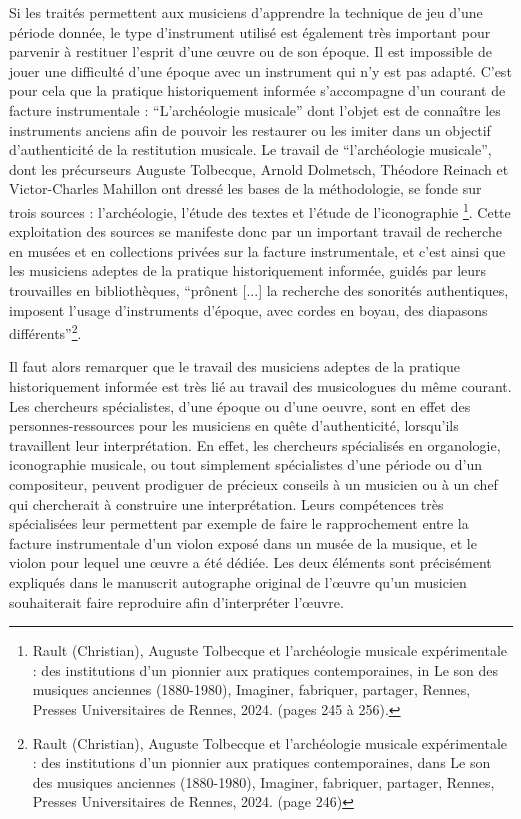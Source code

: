 Si les traités permettent aux musiciens d'apprendre la technique de jeu d'une période donnée, le type d'instrument utilisé est également très important pour parvenir à restituer l'esprit d'une œuvre ou de son époque. Il est impossible de jouer une difficulté d'une époque avec un instrument qui n'y est pas adapté. C'est pour cela que la pratique historiquement informée s'accompagne d'un courant de facture instrumentale : \enquote{L'archéologie musicale} dont l'objet est de connaître les instruments anciens afin de pouvoir les restaurer ou les imiter dans un objectif d'authenticité de la restitution musicale. Le travail de \enquote{l'archéologie musicale}, dont les précurseurs  Auguste Tolbecque, Arnold Dolmetsch, Théodore Reinach et Victor-Charles Mahillon ont dressé les bases de la méthodologie, se fonde sur trois sources : l'archéologie, l'étude des textes et l'étude de l'iconographie \footnote{Rault (Christian), Auguste Tolbecque et l'archéologie musicale expérimentale : des institutions d'un pionnier aux pratiques contemporaines, in Le son des musiques anciennes (1880-1980), Imaginer, fabriquer, partager, Rennes, Presses Universitaires de Rennes, 2024. (pages 245 à 256).}. Cette exploitation des sources se manifeste donc par un important travail de recherche en musées et en collections privées sur la facture instrumentale, et c'est ainsi que les musiciens adeptes de la pratique historiquement informée, guidés par leurs trouvailles en bibliothèques, \enquote{prônent [...] la recherche des sonorités authentiques, imposent l'usage d'instruments d'époque, avec cordes en boyau, des diapasons différents}\footnote{Rault (Christian), Auguste Tolbecque et l'archéologie musicale expérimentale : des institutions d'un pionnier aux pratiques contemporaines, dans Le son des musiques anciennes (1880-1980), Imaginer, fabriquer, partager, Rennes, Presses Universitaires de Rennes, 2024. (page 246)}.

Il faut alors remarquer que le travail des musiciens adeptes de la pratique historiquement informée est très lié au travail des musicologues du même courant. 
Les chercheurs spécialistes, d'une époque ou d'une oeuvre, sont en effet des personnes-ressources pour les musiciens en quête d'authenticité, lorsqu'ils travaillent leur interprétation.
En effet,  les chercheurs spécialisés en organologie, iconographie musicale, ou tout simplement spécialistes d'une période ou d'un compositeur, peuvent prodiguer de précieux conseils à un musicien ou à un chef qui chercherait à construire une interprétation.
Leurs compétences très spécialisées leur permettent par exemple de faire le rapprochement entre la facture instrumentale d'un violon exposé dans un musée de la musique, et le violon pour lequel une œuvre a été dédiée. Les deux éléments sont précisément expliqués dans le manuscrit autographe original de l'œuvre qu'un musicien souhaiterait faire reproduire afin d'interpréter l'œuvre. 

